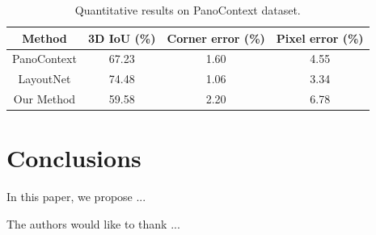 \begin{table}
	\caption{Quantitative results on PanoContext dataset.}
	\label{tab:PC}
	\begin{tabular}{cccc}
		\toprule
		Method&3D IoU (\%)&Corner error (\%)&Pixel error (\%)\\
		\midrule
		PanoContext & 67.23 & 1.60 & 4.55\\
		LayoutNet & 74.48 & 1.06 & 3.34\\
		Our Method & 59.58 & 2.20 & 6.78\\		
		\bottomrule
	\end{tabular}
\end{table}

\section{Conclusions}
In this paper, we propose ...


\begin{acks}
  The authors would like to thank ...
\end{acks}
